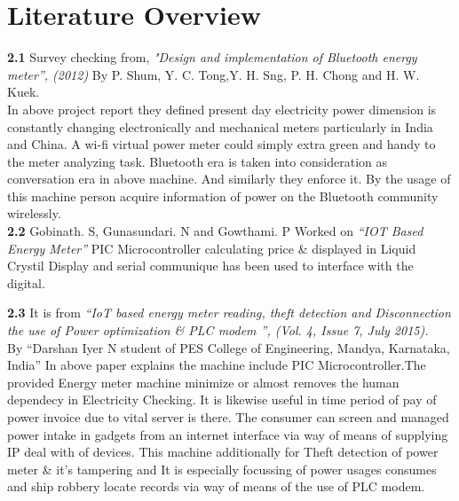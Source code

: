 \documentclass[12pt,a4paper]{article}
\begin{document}

\newpage
\pagebreak
\vspace*{\fill}%
\noindent
{}
\vfill


\newpage
\section{Literature Overview}
\fancyfoot[R]{\thepage}

\hspace{0.5cm} \textbf{2.1} Survey checking from,\emph{ "Design and implementation of Bluetooth energy meter”, (2012)}
By P. Shum, Y. C. Tong,Y. H. Sng, P. H. Chong and H. W. Kuek.\\

In above project report they defined present day electricity power dimension is constantly changing electronically and mechanical meters particularly in India and China. A wi-fi virtual power meter could simply extra green and handy to the meter analyzing task. Bluetooth era is taken into consideration as conversation era in above machine. And similarly they enforce it. By the usage of this machine person acquire information of power on the Bluetooth community wirelessly. \\

\hspace{0.2cm} \textbf{2.2} Gobinath. S, Gunasundari. N and Gowthami. P Worked on \emph{“IOT Based Energy Meter”} PIC Microcontroller calculating price \& displayed in Liquid Crystil Display and serial communique has been used to interface with the digital.

\hspace{0.2cm} \textbf{2.3} It is from \emph{  “IoT based energy meter reading, theft detection and Disconnection the use of Power optimization \& PLC modem ”, (Vol. 4, Issue 7, July 2015).}\\

By “Darshan Iyer N student of PES College of Engineering, Mandya, Karnataka, India”
In above paper explains the machine include PIC Microcontroller.The provided Energy meter machine minimize or almost removes the human dependecy in Electricity Checking. It is likewise useful in time period of pay of power invoice due to vital server is there. The consumer can screen and managed power intake in gadgets from an internet interface via way of means of supplying IP deal with of devices. This machine additionally for Theft detection of power meter \& it's tampering and It is especially focussing of power usages consumes and ship robbery locate records via way of means of the use of PLC modem.\\
\end{document}
